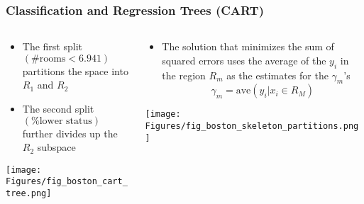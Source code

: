 \documentclass{beamer}
\begin{document}
\begin{frame}

    \frametitle{Classification and Regression Trees (CART)}
    
    \begin{columns}
    
    \begin{column}{0.5\textwidth}
        \begin{itemize}
            \footnotesize
            \item The first split $(\# \text{rooms} < 6.941)$ partitions the 
                  space into $R_1$ and $R_2$ 
            \item The second split $(\% \text{lower status})$ further divides up 
                  the $R_2$ subspace
        \end{itemize}
        \begin{center}
            \texttt{[image: Figures/fig\_boston\_cart\_tree.png]}
        \end{center}
   \end{column}
   
    \begin{column}{0.5\textwidth}
        \begin{itemize}
            \footnotesize
            \item The solution that minimizes the sum of squared errors uses the
              average of the $y_i$ in the region $R_m$ as the estimates for the
              $\gamma_m$'s
              \begin{equation*}
                \hat{\gamma}_m = \text{ave}(y_i|x_i \in R_M)
              \end{equation*}
        \end{itemize}
        \begin{center}
            \texttt{[image: Figures/fig\_boston\_skeleton\_partitions.png]}
        \end{center}
    \end{column}
    
    \end{columns}

\end{frame}


\end{document}
